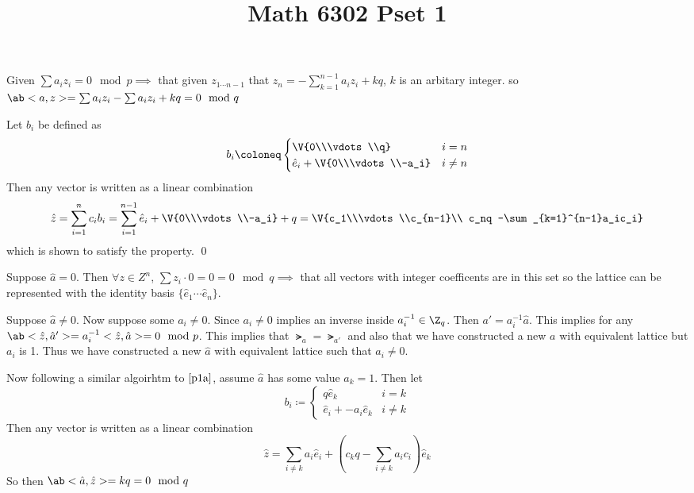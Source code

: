 \documentclass[12pt]{amsart}
\title{Math 6302 Pset 1}
\begin{document}
  \maketitle
  \begin{problem}
    \begin{subproblem}[][p1b]
      Given $\sum a_i z_i = 0\mod p \implies$ that given $z_{1\cdots n-1}$ that $z_n = - \sum_{k=1}^{n-1}a_iz_i + kq$, $k$ is an arbitary integer. so $\ab<a,z> = \sum a_iz_i - \sum a_iz_i + kq = 0\mod q$  

      Let $b_i$ be defined as 
      \[b_i \coloneq \begin{cases}
        \V{0\\\vdots\\q} & i=n \\
        \hat e_i + \V{0\\\vdots\\-a_i} & i\neq n
      \end{cases}\]
      Then any vector is written as a linear combination
      \[\hat z = \sum_{i=1}^n c_ib_i = \sum_{i=1}^{n-1} \hat e_i + \V{0\\\vdots\\-a_i} + q = \V{c_1\\\vdots\\c_{n-1}\\ c_nq -\sum_{k=1}^{n-1}a_ic_i}\] 
      which is shown to satisfy the property. \qed
    \end{subproblem} 
    \begin{subproblem}
      Suppose $\hat a = 0$. Then $\forall z\in Z^n$, $\sum z_i\cdot 0 = 0 = 0\mod q \implies$ that all vectors with integer coefficents are in this set so the lattice can be represented with the identity basis $\{\hat e_1 \cdots \hat e_n\}$. 

      Suppose $\hat a \neq 0$. Now suppose some $a_i \neq 0$. Since $a_i\neq 0$ implies an inverse inside $a^{-1}_i\in \Z_q$. Then $a' = a_i^{-1}\hat a$. This implies for any $\ab<\hat z, \hat a'>= a_i^{-1}<\hat z, \hat a> = 0\mod p$. This implies that $\lat_a = \lat_{a'}$ and also that we have constructed a new $a$ with equivalent lattice but $a_i$ is 1. Thus we have constructed a new $\hat a$ with equivalent lattice such that $a_i\neq 0$.  
      
      Now following a similar algoirhtm to $\ref{p1a}$, assume $\hat a$ has some value $a_k=1$. Then let 
      \[b_i \coloneq \begin{cases}
        q\hat e_k & i=k \\
        \hat e_i + -a_i \hat e_k & i\neq k
      \end{cases}\] 
      Then any vector is written as a linear combination
      \[\hat z = \sum_{i\neq k} a_i\hat e_i + (c_kq-\sum_{i\neq k}a_ic_i)\hat e_k\] 
      So then $\ab<\hat a, \hat z> = kq = 0\mod q$


\end{subproblem}
\end{problem}
\end{document}
